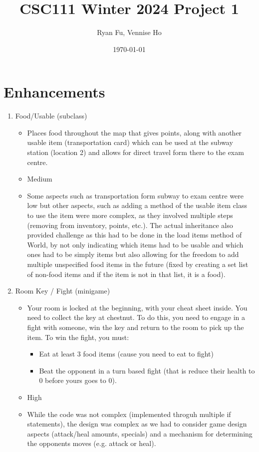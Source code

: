 \documentclass[11pt]{article}
\title{CSC111 Winter 2024 Project 1}
\author{Ryan Fu, Vennise Ho}
\date{\today}
\begin{document}
\maketitle

\section*{Enhancements}


\begin{enumerate}

\item Food/Usable (subclass)
	\begin{itemize}
	\item Places food throughout the map that gives points, along with another usable item (transportation card)
	which can be used at the subway station (location 2) and allows for direct travel form there to the exam centre.
	\item Medium
	\item Some aspects such as transportation form subway to exam centre were low but other aspects, such as adding a
	method of the usable item class to use the item were more complex, as they involved multiple steps (removing from inventory, points, etc.). The actual inheritance also provided challenge as this had to be done in the load items method of World, by not only indicating which items had to be usable and which ones had to be simply items but also allowing for the freedom to add multiple unspecified food items in the future (fixed by creating a set list of non-food items and if the item is not in that list, it is a food).
	\end{itemize}


\item Room Key / Fight (minigame)
	\begin{itemize}
	\item Your room is locked at the beginning, with your cheat sheet inside. You need to collect the key at chestnut.
	To do this, you need to engage in a fight with someone, win the key and return to the room to pick up the item.
	To win the fight, you must:
            \begin{itemize}
            \item Eat at least 3 food items (cause you need to eat to fight)
            \item Beat the opponent in a turn based fight (that is reduce their health to 0 before yours goes to 0).
            \end{itemize}
	\item High
	\item While the code was not complex (implemented throguh multiple if statements), the design was complex as we had
	 to consider game design aspects (attack/heal amounts, specials) and a mechanism for determining the opponents moves
	  (e.g. attack or heal).
	\end{itemize}



\end{enumerate}
\end{document}
